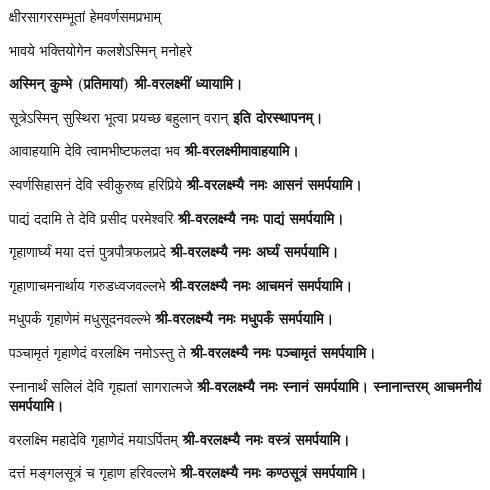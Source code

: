 \begin{center}

{क्षीरसागरसम्भूतां हेमवर्णसमप्रभाम्}

{भावये भक्तियोगेन कलशेऽस्मिन् मनोहरे} 

\textbf{अस्मिन् कुम्भे (प्रतिमायां) श्री-वरलक्ष्मीं ध्यायामि।}
\medskip


{सूत्रेऽस्मिन् सुस्थिरा भूत्वा प्रयच्छ बहुलान् वरान्} 
\textbf{इति दोरस्थापनम्।}\medskip

{आवाहयामि देवि त्वामभीष्टफलदा भव}
\textbf{श्री-वरलक्ष्मीमावाहयामि।}

{स्वर्णसिहासनं देवि स्वीकुरुष्व हरिप्रिये} 
\textbf{श्री-वरलक्ष्म्यै नमः आसनं समर्पयामि।}


{पाद्यं ददामि ते देवि प्रसीद परमेश्वरि}
\textbf{श्री-वरलक्ष्म्यै नमः पाद्यं समर्पयामि।}
\medskip

{गृहाणार्घ्यं मया दत्तं पुत्रपौत्रफलप्रदे}
\textbf{श्री-वरलक्ष्म्यै नमः अर्घ्यं समर्पयामि।}
\medskip

{गृहाणाचमनार्थाय गरुडध्वजवल्लभे}
\textbf{श्री-वरलक्ष्म्यै नमः आचमनं समर्पयामि।}
\medskip

{मधुपर्कं गृहाणेमं मधुसूदनवल्ल्भे}
\textbf{श्री-वरलक्ष्म्यै नमः मधुपर्कं समर्पयामि।}
\medskip

{पञ्चामृतं गृहाणेदं वरलक्ष्मि नमोऽस्तु ते}
\textbf{श्री-वरलक्ष्म्यै नमः पञ्चामृतं समर्पयामि।}
\medskip

{स्नानार्थं सलिलं देवि गृह्यतां सागरात्मजे}
\textbf{श्री-वरलक्ष्म्यै नमः स्नानं समर्पयामि। स्नानान्तरम् आचमनीयं समर्पयामि।}
\medskip

{वरलक्ष्मि महादेवि गृहाणेदं मयाऽर्पितम्}
\textbf{श्री-वरलक्ष्म्यै नमः वस्त्रं समर्पयामि।}
\medskip

{दत्तं मङ्गलसूत्रं च गृहाण हरिवल्लभे}
\textbf{श्री-वरलक्ष्म्यै नमः कण्ठसूत्रं समर्पयामि।}
\medskip


\end{center}
